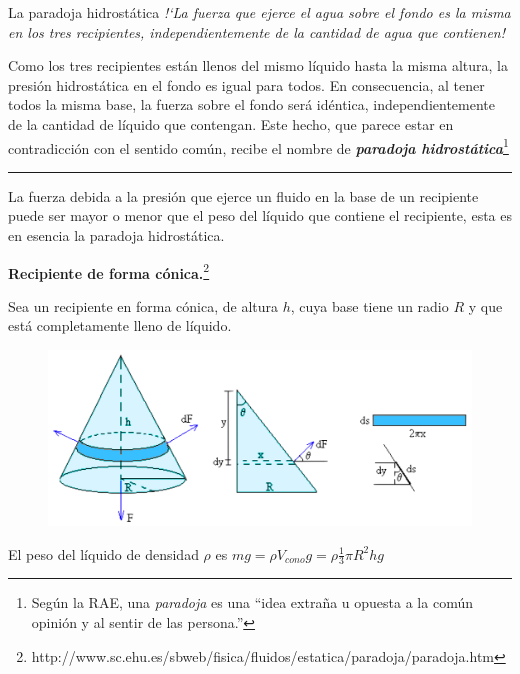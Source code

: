 \begin{myblock}{La paradoja hidrostática}
\emph{!`La fuerza que ejerce el agua sobre el fondo es la misma en los tres recipientes, independientemente de la cantidad de agua que contienen!}

Como los tres recipientes están llenos del mismo líquido hasta la misma altura, la presión hidrostática en el fondo es igual para todos. En consecuencia, al tener todos la misma base, la fuerza sobre el fondo será idéntica, independientemente de la cantidad de líquido que contengan. Este hecho, que parece estar en contradicción con el sentido común, recibe el nombre de \emph{\textbf{paradoja hidrostática}}\footnote{Según la RAE, una \emph{paradoja} es una ``idea extraña u opuesta a la común opinión y al sentir de las persona.''}

\vspace{4mm}
 
 \rule{100pt}{0.2pt}

\vspace{4mm}
La fuerza debida a la presión que ejerce un fluido en la base de un recipiente puede ser mayor o menor que el peso del líquido que contiene el recipiente, esta es en esencia la paradoja hidrostática.

\vspace{4mm}
\textbf{Recipiente de forma cónica.}\footnote{http://www.sc.ehu.es/sbweb/fisica/fluidos/estatica/paradoja/paradoja.htm}

\vspace{2mm} Sea un recipiente en forma cónica, de altura $h$, cuya base tiene un radio $R$ y que está completamente lleno de líquido.

\begin{figure}[H]
	\centering
	\includegraphics[width=1\textwidth]{imagenes/imagenes07/T07IM26.png}
\end{figure}

\vspace{2mm} El peso del líquido de densidad $\rho$ es $mg=\rho V_{cono} g=\rho \frac 1 3 \pi R^2 h g$


\end{myblock}
